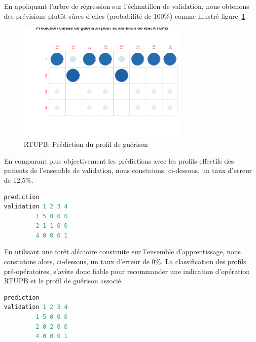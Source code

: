 En appliquant l'arbre de régression sur l'échantillon de validation, nous obtenons des prévisions plutôt sûres d'elles (probabilité de 100\%) comme illustré figure~\ref{fig-rtupb-predict-healing-class}.

\begin{figure}[H]
\centering
\includegraphics[width=0.75\textwidth]{../Fig/RTUPB/rtupb-predict-healing-class.png}
\caption{RTUPB: Prédiction du profil de guérison}
\label{fig-rtupb-predict-healing-class}
\end{figure}

En comparant plus objectivement les prédictions avec les profils effectifs des patients de l'ensemble de validation, nous constatons, ci-dessous, un taux d'erreur de 12,5\%.

\begin{lstlisting}[language=R]
          prediction
validation 1 2 3 4
         1 5 0 0 0
         2 1 1 0 0
         4 0 0 0 1
\end{lstlisting}

En utilisant une forêt aléatoire construite sur l'ensemble d'apprentissage, nous constatons alors, ci-dessous, un taux d'erreur de 0\%. La classification des profils pré-opératoires, s'avère donc fiable pour recommander une indication d'opération RTUPB et le profil de guérison associé.

\begin{lstlisting}[language=R]
          prediction
validation 1 2 3 4
         1 5 0 0 0
         2 0 2 0 0
         4 0 0 0 1
\end{lstlisting}


